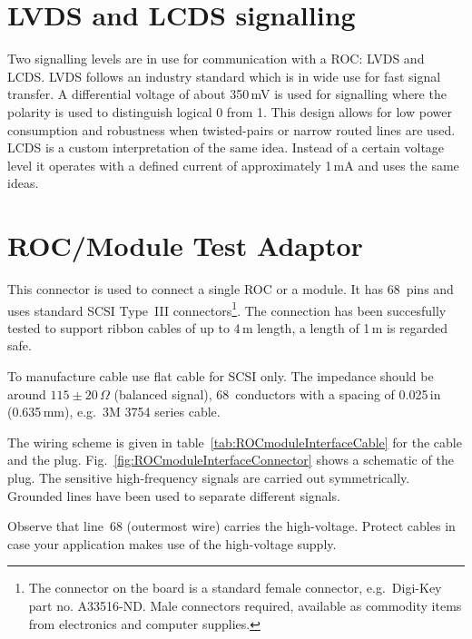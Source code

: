 \section{LVDS and LCDS signalling} \label{sec:LVDSsignal}
Two signalling levels are in use for communication with a \gls{ROC}: \gls{LVDS} and \gls{LCDS}. \gls{LVDS} follows an industry standard \cite{wikiLVDS} which is in wide use for fast signal transfer. A differential voltage of about 350\,mV is used for signalling where the polarity is used to distinguish logical 0 from 1. This design allows for low power consumption and robustness when twisted-pairs or narrow routed lines are used. \gls{LCDS} is a custom interpretation of the same idea. Instead of a certain voltage level it operates with a defined current of approximately 1\,mA and uses the same ideas.


\section{ROC/Module Test Adaptor} \label{sec:ROCadapter}

This connector is used to connect a single \gls{ROC} or a module. It has 68~pins and uses standard SCSI Type~III connectors\footnote{The connector on the board is a standard female connector, e.g.~Digi-Key part no. A33516-ND. Male connectors required, available as commodity items from electronics and computer supplies.}. The connection has been succesfully tested to support ribbon cables of up to 4\,m length, a length of 1\,m is regarded safe.

To manufacture cable use flat cable for SCSI only. The impedance should be around $115\pm20\,\Omega$ (balanced signal), 68~conductors with a spacing of 0.025\,in (0.635\,mm), e.g.~3M 3754 series cable.

The wiring scheme is given in table~\ref{tab:ROCmoduleInterfaceCable} for the cable and the plug. Fig.~\ref{fig:ROCmoduleInterfaceConnector} shows a schematic of the plug. The sensitive high-frequency signals are carried out symmetrically. Grounded lines have been used to separate different signals.

Observe that line~68 (outermost wire) carries the high-voltage. Protect cables in case your application makes use of the high-voltage supply.

